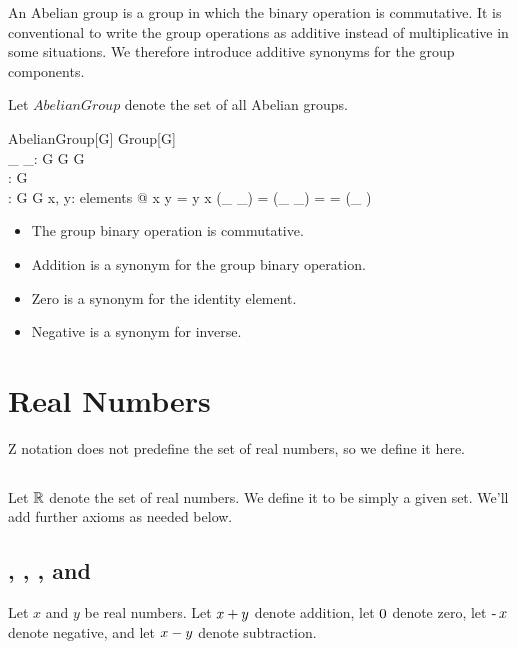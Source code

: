 \documentclass[12pt]{article}
\begin{document}
An Abelian group is a group in which the binary operation is commutative.
It is conventional to write the group operations as additive instead of multiplicative in some situations.
We therefore introduce additive synonyms for the group components.

Let $AbelianGroup$ denote the set of all Abelian groups.

\begin{schema}{AbelianGroup}[G]
Group[G] \\
\_ \addG \_: G \cross G \pfun G \\
\zeroG: G \\
\negG: G \pfun G
\where
\forall x, y: elements @ x \mulG y = y \mulG x
\also
(\_ \addG \_) = (\_ \mulG \_)
\also
\zeroG = \oneG
\also
\negG = (\_ \invG)
\end{schema}

\begin{itemize}
\item The group binary operation is commutative.
\item Addition is a synonym for the group binary operation.
\item Zero is a synonym for the identity element.
\item Negative is a synonym for inverse.
\end{itemize}

\section{Real Numbers}

Z notation does not predefine the set of real numbers, so we define it here.

\subsection{}

Let $\mathbb{R}$ denote the set of real numbers.
We define it to be simply a given set.
We'll add further axioms as needed below.

\begin{zed}
[\RR]
\end{zed}

\subsection{, , , and }

Let $x$ and $y$ be real numbers.
Let $x \mathbin{+} y$ denote addition, 
let $0$ denote zero,
let $\operatorname{-} x$ denote negative,
and let $x \mathbin{-} y$ denote subtraction.
\end{document}

